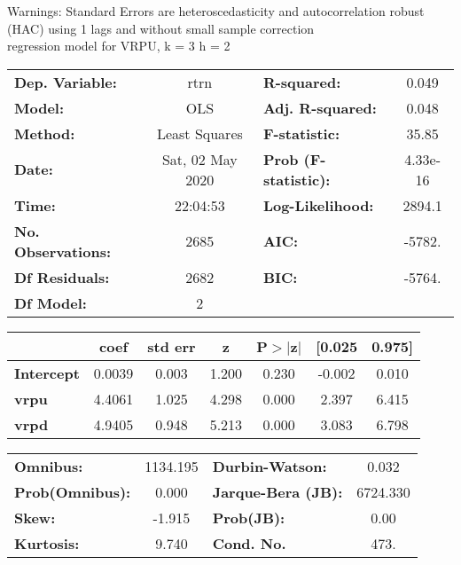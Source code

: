 Warnings: \newline
 [1] Standard Errors are heteroscedasticity and autocorrelation robust (HAC) using 1 lags and without small sample correction\\ 

regression model for VRPU, k = 3 h = 2\begin{center}
\begin{tabular}{lclc}
\toprule
\textbf{Dep. Variable:}    &       rtrn       & \textbf{  R-squared:         } &     0.049   \\
\textbf{Model:}            &       OLS        & \textbf{  Adj. R-squared:    } &     0.048   \\
\textbf{Method:}           &  Least Squares   & \textbf{  F-statistic:       } &     35.85   \\
\textbf{Date:}             & Sat, 02 May 2020 & \textbf{  Prob (F-statistic):} &  4.33e-16   \\
\textbf{Time:}             &     22:04:53     & \textbf{  Log-Likelihood:    } &    2894.1   \\
\textbf{No. Observations:} &        2685      & \textbf{  AIC:               } &    -5782.   \\
\textbf{Df Residuals:}     &        2682      & \textbf{  BIC:               } &    -5764.   \\
\textbf{Df Model:}         &           2      & \textbf{                     } &             \\
\bottomrule
\end{tabular}
\begin{tabular}{lcccccc}
                   & \textbf{coef} & \textbf{std err} & \textbf{z} & \textbf{P$> |$z$|$} & \textbf{[0.025} & \textbf{0.975]}  \\
\midrule
\textbf{Intercept} &       0.0039  &        0.003     &     1.200  &         0.230        &       -0.002    &        0.010     \\
\textbf{vrpu}      &       4.4061  &        1.025     &     4.298  &         0.000        &        2.397    &        6.415     \\
\textbf{vrpd}      &       4.9405  &        0.948     &     5.213  &         0.000        &        3.083    &        6.798     \\
\bottomrule
\end{tabular}
\begin{tabular}{lclc}
\textbf{Omnibus:}       & 1134.195 & \textbf{  Durbin-Watson:     } &    0.032  \\
\textbf{Prob(Omnibus):} &   0.000  & \textbf{  Jarque-Bera (JB):  } & 6724.330  \\
\textbf{Skew:}          &  -1.915  & \textbf{  Prob(JB):          } &     0.00  \\
\textbf{Kurtosis:}      &   9.740  & \textbf{  Cond. No.          } &     473.  \\
\bottomrule
\end{tabular}
\end{center}

